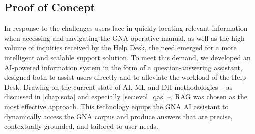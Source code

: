 \begin{spacing}{1.5}
\section{Proof of Concept}
In response to the challenges users face in quickly locating relevant information when accessing and navigating the GNA operative manual, as well as the high volume of inquiries received by the Help Desk, the need emerged for a more intelligent and scalable support solution. To meet this demand, we developed an AI-powered information system in the form of a question-answering assistant, designed both to assist users directly and to alleviate the workload of the Help Desk. Drawing on the current state of AI, ML and DH methodologies -- as discussed in \autoref{chap:sota} and especially \autoref{sec:evol_qas} --, RAG was chosen as the most effective approach. This technology equips the GNA AI assistant to dynamically access the GNA corpus and produce answers that are precise, contextually grounded, and tailored to user needs.


\end{spacing}
